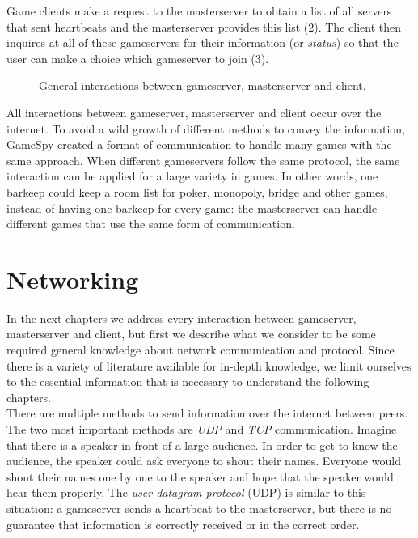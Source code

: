 Game clients make a request to the masterserver to obtain a list of all servers that sent heartbeats and the masterserver provides this list (2). The client then inquires at all of these gameservers for their information (or \emph{status}) so that the user can make a choice which gameserver to join (3).

\begin{figure}[ht]
\centering

\caption{General interactions between gameserver, masterserver and client.}\label{fig:totaloverview}
\end{figure}

All interactions between gameserver, masterserver and client occur over the internet. To avoid a wild growth of different methods to convey the information, GameSpy created a format of communication to handle many games with the same approach. When different gameservers follow the same protocol, the same interaction can be applied for a large variety in games. In other words, one barkeep could keep a room list for poker, monopoly, bridge and other games, instead of having one barkeep for every game: the masterserver can handle different games that use the same form of communication.

\section{Networking}
In the next chapters we address every interaction between gameserver, masterserver and client, but first we describe what we consider to be some required general knowledge about network communication and protocol. Since there is a variety of literature available for in-depth knowledge, we limit ourselves to the essential information that is necessary to understand the following chapters.\\

There are multiple methods to send information over the internet between peers. The two most important methods are \emph{UDP} and \emph{TCP} communication. Imagine that there is a speaker in front of a large audience. In order to get to know the audience, the speaker could ask everyone to shout their names. Everyone would shout their names one by one to the speaker and hope that the speaker would hear them properly. The \emph{user datagram protocol} (UDP) is similar to this situation: a gameserver sends a heartbeat to the masterserver, but there is no guarantee that information is correctly received or in the correct order.\\


